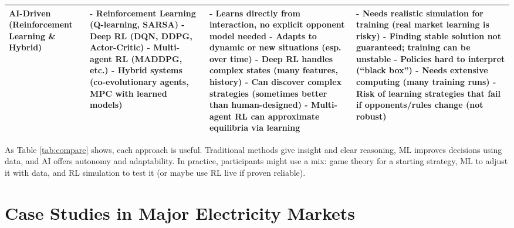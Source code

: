 \documentclass[conference]{IEEEtran}
\begin{document}
\begin{table*}[ht]
\begin{tabular}{|p{3cm}|p{4.2cm}|p{4.8cm}|p{4.8cm}|}
        \hline
        AI-Driven (Reinforcement Learning \& Hybrid) & 
            - Reinforcement Learning (Q-learning, SARSA) \newline 
            - Deep RL (DQN, DDPG, Actor-Critic) \cite{Wang2017, Liu2021} \newline 
            - Multi-agent RL (MADDPG, etc.) \newline 
            - Hybrid systems (co-evolutionary agents, MPC with learned models) 
        & 
            - Learns directly from interaction, no explicit opponent model needed \newline 
            - Adapts to dynamic or new situations (esp. over time) \newline 
            - Deep RL handles complex states (many features, history) \newline 
            - Can discover complex strategies (sometimes better than human-designed) \newline 
            - Multi-agent RL can approximate equilibria via learning \cite{Wang2017, Liu2021} 
        & 
            - Needs realistic simulation for training (real market learning is risky) \newline 
            - Finding stable solution not guaranteed; training can be unstable \newline 
            - Policies hard to interpret (“black box”) \newline 
            - Needs extensive computing (many training runs) \newline 
            - Risk of learning strategies that fail if opponents/rules change (not robust) \\
        \hline
    \end{tabular}
\end{table*}

As Table \ref{tab:compare} shows, each approach is useful. Traditional methods give insight and clear reasoning, ML improves decisions using data, and AI offers autonomy and adaptability. In practice, participants might use a mix: game theory for a starting strategy, ML to adjust it with data, and RL simulation to test it (or maybe use RL live if proven reliable).

\section{Case Studies in Major Electricity Markets}
\end{document}
